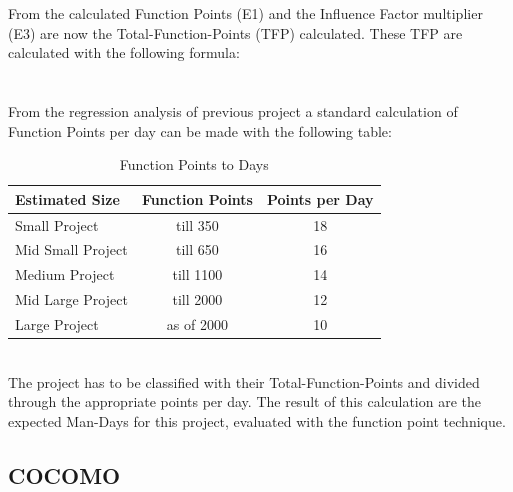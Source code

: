 From the calculated Function Points (E1) and the Influence Factor multiplier (E3) are now the Total-Function-Points (TFP) calculated. These TFP are calculated with the following formula:\\
\\
\\
From the regression analysis of previous project a standard calculation of Function Points per day can be made with the following table:
\begin{table}[h] 
	\centering 
	\setlength{\tabcolsep}{4pt}
	\begin{tabular}{|l||c|c|}\hline
		Estimated Size    & Function Points & Points per Day\\ \hline\hline
		Small Project     & till 350        & 18 \\ \hline
		Mid Small Project & till 650        & 16 \\ \hline
		Medium Project    & till 1100 		& 14 \\ \hline
		Mid Large Project & till 2000 		& 12\\ \hline
		Large Project     & as of 2000 		& 10 \\ \hline
	\end{tabular}
	\caption{Function Points to Days} 
	\label{tab:pointsperday} 
\end{table} 
\\
The project has to be classified with their Total-Function-Points and divided through the appropriate points per day. The result of this calculation are the expected Man-Days for this project, evaluated with the function point technique.

\subsection{COCOMO} \label{COCOMOMethod}

